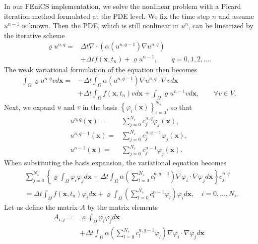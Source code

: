 \documentclass[twoside]{article}
\begin{document}
In our FEniCS implementation, we solve the nonlinear problem with a Picard iteration method formulated at the PDE level. We fix the time step $n$ and assume $u^{n-1}$ is known. Then the PDE, which is still nonlinear in $u^{n}$, can be linearized by the iterative scheme
\begin{align}
  \varrho u^{n, q} =& \Delta t \nabla \cdot \left( \alpha(u^{n, q-1})\nabla u^{n, q}\right) \nonumber \\
& + \Delta t f(\mathbf{x}, t_{n}) + \varrho u^{n-1}, \qquad q = 0, 1, 2, \dots .
\end{align}
The weak variational formulation of the equation then becomes 
\begin{align}
  \int_{\Omega }\varrho u^{n, q}v d\mathbf{x} =& -\Delta t \int_{\Omega }\alpha(u^{n, q-1})\nabla u^{n, q}\cdot \nabla v d\mathbf{x} \nonumber \\
  & + \Delta t \int_{\Omega }f(\mathbf{x}, t_{n})v d\mathbf{x} + \int_{\Omega }\varrho u^{n-1}v d\mathbf{x}, \qquad \forall v \in V.
\end{align}
Next, we expand $u$ and $v$ in the basis $\left\{ \varphi_{i}(\mathbf{x}) \right\}_{i=0}^{N_{s}}$, so that
\begin{align}
  u^{n, q}(\mathbf{x}) =& \sum_{j=0}^{N_{s}}c_{j}^{n, q}\varphi_{j}(\mathbf{x}), \nonumber \\
  u^{n, q-1}(\mathbf{x}) =& \sum_{j=0}^{N_{s}}c_{j}^{n, q-1}\varphi_{j}(\mathbf{x}), \nonumber \\
  u^{n-1}(\mathbf{x}) =& \sum_{j=0}^{N_{s}}c_{j}^{n-1}\varphi_{j}(\mathbf{x}).
\end{align}
When substituting the basis expansion, the variational equation becomes
\begin{align}
  & \sum_{j=0}^{N_{s}} \left\{ \varrho \int_{\Omega }\varphi_{i}\varphi_{j}d\mathbf{x} + \Delta t \int_{\Omega }\alpha\left( \sum_{l=0}^{N_{s}}c_{l}^{n, q-1}\right)\nabla \varphi_{i} \cdot \nabla \varphi_{j}d\mathbf{x} \right\}c_{j}^{n, q} \nonumber \\
  & = \Delta t \int_{\Omega }f(\mathbf{x}, t_{n})\varphi_{i}d\mathbf{x} + \varrho \int_{\Omega } \left( \sum_{l=0}^{N_{s}}c_{l}^{n-1}\varphi_{l} \right)\varphi_{i}d\mathbf{x} , \quad i = 0, \dots , N_{s}.
\end{align}
Let us define the matrix $A$ by the matrix elements
\begin{align}
  A_{i, j} =& \varrho \int_{\Omega }\varphi_{i}\varphi_{j}d\mathbf{x} \nonumber \\
  & + \Delta t \int_{\Omega }\alpha\left( \sum_{l=0}^{N_{s}}c_{l}^{n, q-1}\varphi_{l}\right)\nabla \varphi_{i}\cdot \nabla \varphi_{j}d\mathbf{x}
\end{align}
\end{document}
